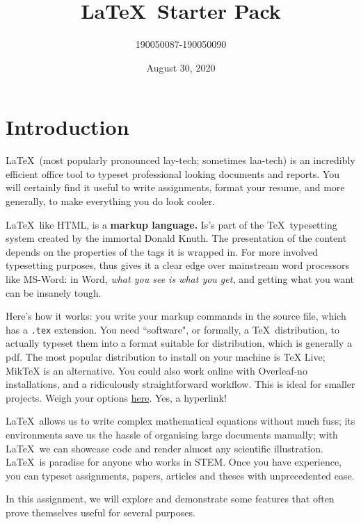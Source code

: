 \documentclass[10pt]{article}
\theoremstyle{remark}
\begin{document}
\title{\LaTeX\ Starter Pack}
\author{190050087-190050090}
\date{August 30, 2020 }
\maketitle
\tableofcontents
\thispagestyle{empty}
\clearpage
{}

\section{Introduction}
\label{intro}
\LaTeX\ (most popularly pronounced lay-tech; sometimes laa-tech) is an incredibly efficient office tool to typeset professional looking documents and reports. You will certainly find it useful to write assignments, format your resume, and more generally, to make everything you do look cooler.




\LaTeX\, like HTML, is a \textbf{markup language.} Is's part of the \TeX\ typesetting system created by the immortal Donald Knuth. The presentation of the content depends on the properties of the tags it is wrapped in. For more involved typesetting purposes, thus gives it a clear edge over mainstream word processors like \textcolor{blue!40!black}{MS-Word}: in Word, \textit{what you see is what you get,} and getting what you want can be insanely tough.




Here's how it works: you write your markup commands in the source file, which has a \verb!.tex! extension. You need ``software", or formally, a \TeX\ distribution, to actually typeset them into a format suitable for distribution, which is generally a pdf. The most popular distribution to install on your machine is TeX Live; MikTeX is an alternative. You could also work online with Overleaf-no installations, and a ridiculously straightforward workflow. This is ideal for smaller projects. Weigh your options \href{https://www.latex-project.org/get/}{here}. Yes, a hyperlink!


\LaTeX\ allows us to write complex mathematical equations without much fuss; its environments
save us the hassle of organising large documents manually; with \LaTeX\ we can showcase code and
render almost any scientific illustration. \LaTeX\ is paradise for anyone who works in STEM. Once
you have experience, you can typeset assignments, papers, articles and theses with unprecedented
ease.



In this assignment, we will explore and demonstrate some features that often prove themselves useful for several purposes.
\end{document}
